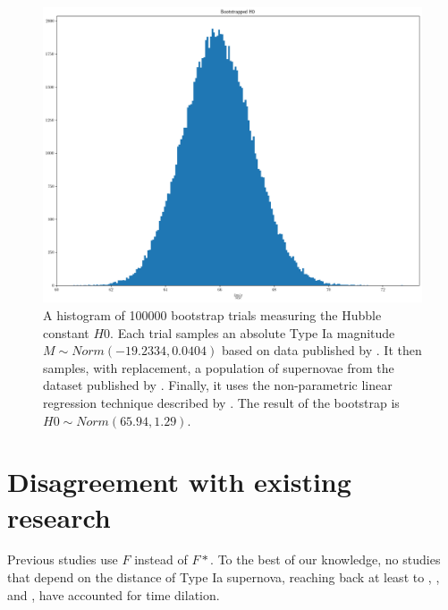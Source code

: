\documentclass{article}
\begin{document}
\begin{figure}[ht]
  \includegraphics[width=\linewidth]{bootstrapped_H0.png}
  \caption{A histogram of 100000 bootstrap trials measuring the Hubble constant
  $H0$. Each trial samples an absolute Type Ia magnitude $M \sim Norm(-19.2334,
  0.0404)$ based on data published by \citet{camarena2020}. It then samples,
  with replacement, a population of supernovae from the dataset published by
  \citet{abbott2024}. Finally, it uses the non-parametric linear regression
  technique described by \citet{siegel1982}. The result of the bootstrap is $H0
  \sim Norm(65.94, 1.29)$.
  }
\end{figure}

\section{Disagreement with existing research}

Previous studies use $F$ instead of $F*$. To the best of our knowledge, no
studies that depend on the distance of Type Ia supernova, reaching back at
least to \citet{kim1996}, \citet{riess1998}, and \citet{perlmutter1999}, have
accounted for time dilation.



\end{document}
